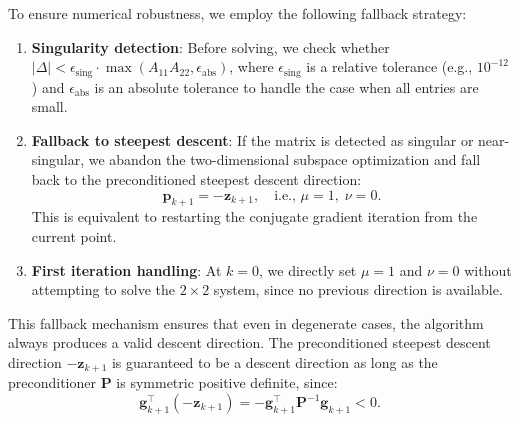 \documentclass[acmtog,anonymous,review,screen,nonacm]{acmart}
\begin{document}
To ensure numerical robustness, we employ the following fallback strategy:
\begin{enumerate}
    \item \textbf{Singularity detection}: Before solving, we check whether $|\Delta| < \epsilon_{\text{sing}} \cdot \max(A_{11} A_{22}, \epsilon_{\text{abs}})$, where $\epsilon_{\text{sing}}$ is a relative tolerance (e.g., $10^{-12}$) and $\epsilon_{\text{abs}}$ is an absolute tolerance to handle the case when all entries are small.
    
    \item \textbf{Fallback to steepest descent}: If the matrix is detected as singular or near-singular, we abandon the two-dimensional subspace optimization and fall back to the preconditioned steepest descent direction:
    \begin{equation}
        \mathbf{p}_{k+1} = -\mathbf{z}_{k+1}, \quad \text{i.e., } \mu = 1, \; \nu = 0.
    \end{equation}
    This is equivalent to restarting the conjugate gradient iteration from the current point.
    
    \item \textbf{First iteration handling}: At $k=0$, we directly set $\mu = 1$ and $\nu = 0$ without attempting to solve the $2 \times 2$ system, since no previous direction is available.
\end{enumerate}

This fallback mechanism ensures that even in degenerate cases, the algorithm always produces a valid descent direction. The preconditioned steepest descent direction $-\mathbf{z}_{k+1}$ is guaranteed to be a descent direction as long as the preconditioner $\mathbf{P}$ is symmetric positive definite, since:
\begin{equation}
    \mathbf{g}_{k+1}^\top (-\mathbf{z}_{k+1}) = -\mathbf{g}_{k+1}^\top \mathbf{P}^{-1} \mathbf{g}_{k+1} < 0.
\end{equation}
\end{document}
